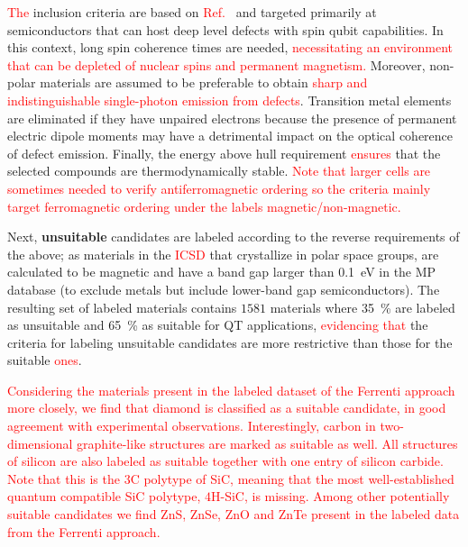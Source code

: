 \documentclass[superscriptaddress,unsortedaddress,
 amsmath,amssymb,
 aps,
]{revtex4-2}
\newcommand{\mrk}[1]{\textcolor{red}{#1}}
\begin{document}
\mrk{The} inclusion criteria are based on \mrk{Ref.}~\cite{Weber2010} and targeted primarily at semiconductors that can host deep level defects with spin qubit capabilities. In this context, long spin coherence times are needed, \mrk{necessitating an environment that can be depleted of nuclear spins and permanent magnetism.} 
Moreover, non-polar materials are assumed to be preferable to obtain \mrk{sharp and indistinguishable single-photon emission from defects}.  
Transition metal elements are eliminated if they have unpaired electrons because the presence of permanent electric dipole moments may have a detrimental impact on the optical coherence of defect emission. 
Finally, the energy above hull requirement \mrk{ensures} that the selected compounds are thermodynamically stable.
\mrk{Note that larger cells are sometimes needed to verify antiferromagnetic ordering so the criteria mainly target ferromagnetic ordering under the labels magnetic/non-magnetic.}

Next, \textbf{unsuitable} candidates are labeled according to the reverse requirements of the above; as materials in the \mrk{ICSD} that crystallize in polar space groups, are calculated to be magnetic and have a band gap larger than \SI{0.1}{\electronvolt} in the MP database (to exclude metals but include lower-band gap semiconductors). 
The resulting set of labeled materials contains $1581$ materials where \SI{35}{\percent}
are labeled as unsuitable and \SI{65}{\percent} 
as suitable for QT applications, \mrk{evidencing that} 
the criteria for labeling unsuitable candidates are more restrictive than those for the suitable \mrk{ones}.


\mrk{Considering the materials present in the labeled dataset of the Ferrenti approach more closely, we find that diamond is classified as a suitable candidate, in good agreement with experimental observations. Interestingly, carbon in two-dimensional graphite-like structures are marked as suitable as well. All structures of silicon are also labeled as suitable together with one entry of silicon carbide. Note that this is the $3$C polytype of SiC, meaning that the most well-established quantum compatible SiC polytype, $4$H-SiC, is missing. 
Among other potentially suitable candidates we find ZnS, ZnSe, ZnO and ZnTe present in the labeled data from the Ferrenti approach.} 
\end{document}
